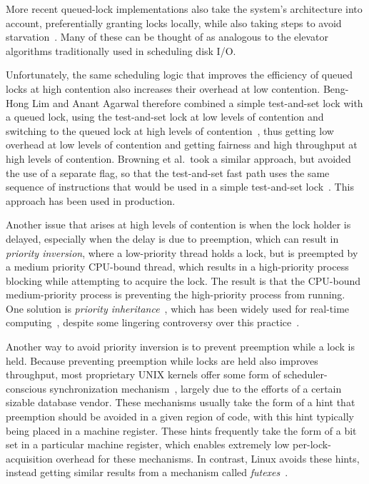 More recent queued-lock implementations also take the system's architecture
into account, preferentially granting locks locally, while also taking
steps to avoid
starvation~\cite{McKenney02e,radovic03hierarchical,radovic02efficient,BenJackson02,McKenney02d}.
Many of these can be thought of as analogous to the elevator algorithms
traditionally used in scheduling disk I/O.

Unfortunately, the same scheduling logic that improves the efficiency
of queued locks at high contention also increases their overhead at
low contention.
Beng-Hong Lim and Anant Agarwal therefore combined a simple test-and-set
lock with a queued lock, using the test-and-set lock at low levels of
contention and switching to the queued lock at high levels of
contention~\cite{BengHongLim94}, thus getting low overhead at low levels
of contention and getting fairness and high throughput at high levels
of contention.
Browning et al.\ took a similar approach, but avoided the use of a separate
flag, so that the test-and-set fast path uses the same sequence of
instructions that would be used in a simple test-and-set
lock~\cite{LukeBrowning2005SimpleLockNUMAAware}.
This approach has been used in production.

Another issue that arises at high levels of contention is when the
lock holder is delayed, especially when the delay is due to
preemption, which can result in \emph{priority inversion},
where a low-priority thread holds a lock, but is preempted
by a medium priority CPU-bound thread, which results in
a high-priority process blocking while attempting to acquire the
lock.
The result is that the CPU-bound medium-priority process is preventing the
high-priority process from running.
One solution is \emph{priority inheritance}~\cite{Lampson1980Mesa},
which has been widely used for real-time
computing~\cite{LuiSha1990PriorityInheritance,JonathanCorbet2006PriorityInheritance},
despite some lingering controversy over this
practice~\cite{Yodaiken2004FSM,DougLocke2002a}.

Another way to avoid priority inversion is to prevent preemption
while a lock is held.
Because preventing preemption while locks are held also improves throughput,
most proprietary UNIX kernels offer some form of scheduler-conscious
synchronization mechanism~\cite{Kontothanassis97a},
largely due to the efforts of a certain sizable database vendor.
These mechanisms usually take the form of a hint that preemption
should be avoided in a given region of code, with this hint typically
being placed in a machine register.
These hints frequently take the form of a bit set in a particular
machine register, which enables extremely low per-lock-acquisition overhead
for these mechanisms.
In contrast, Linux avoids these hints, instead getting
similar results from a mechanism called
\emph{futexes}~\cite{HubertusFrancke2002Futex,IngoMolnar2006RobustFutexes,StevenRostedt2006piFutexes,UlrichDrepper2011Futexes}.

